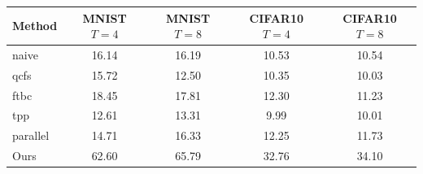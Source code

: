 {\small\begin{tabular}{lcccc}\hline
Method & MNIST $T{=}4$ & MNIST $T{=}8$ & CIFAR10 $T{=}4$ & CIFAR10 $T{=}8$ \\\hline
naive & 16.14 & 16.19 & 10.53 & 10.54 \\
qcfs & 15.72 & 12.50 & 10.35 & 10.03 \\
ftbc & 18.45 & 17.81 & 12.30 & 11.23 \\
tpp & 12.61 & 13.31 & 9.99 & 10.01 \\
parallel & 14.71 & 16.33 & 12.25 & 11.73 \\
Ours & 62.60 & 65.79 & 32.76 & 34.10 \\
\hline\end{tabular}}
